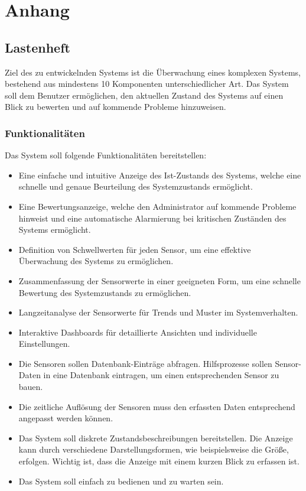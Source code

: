 

\appendix
\section{Anhang}



\subsection{Lastenheft}\label{appendix:a1}\par

Ziel des zu entwickelnden Systems ist die Überwachung eines komplexen Systems, bestehend aus mindestens 10 Komponenten unterschiedlicher Art. Das System soll dem Benutzer ermöglichen, den aktuellen Zustand des Systems auf einen Blick zu bewerten und auf kommende Probleme hinzuweisen.



	\subsubsection{Funktionalitäten}
			Das System soll folgende Funktionalitäten bereitstellen:
		\begin{itemize}
		\item Eine einfache und intuitive Anzeige des Ist-Zustands des Systems, welche eine schnelle und genaue Beurteilung des Systemzustands ermöglicht.
		\item Eine Bewertungsanzeige, welche den Administrator auf kommende Probleme hinweist und eine automatische Alarmierung bei kritischen Zuständen des Systems ermöglicht.
		\item Definition von Schwellwerten für jeden Sensor, um eine effektive Überwachung des Systems zu ermöglichen.
		\item Zusammenfassung der Sensorwerte in einer geeigneten Form, um eine schnelle Bewertung des Systemzustands zu ermöglichen.
		\item Langzeitanalyse der Sensorwerte für Trends und Muster im Systemverhalten.
		\item Interaktive Dashboards für detaillierte Ansichten und individuelle Einstellungen.
		\item Die Sensoren sollen Datenbank-Einträge abfragen. Hilfsprozesse sollen Sensor-Daten in eine Datenbank eintragen, um einen entsprechenden Sensor zu bauen.
		\item Die zeitliche Auflösung der Sensoren muss den erfassten Daten entsprechend angepasst werden können.
		\item Das System soll diskrete Zustandsbeschreibungen bereitstellen. Die Anzeige kann durch verschiedene Darstellungsformen, wie beispielsweise die Größe, erfolgen. Wichtig ist, dass die Anzeige mit einem kurzen Blick zu erfassen ist.
		\item Das System soll einfach zu bedienen und zu warten sein.
		\end{itemize}

